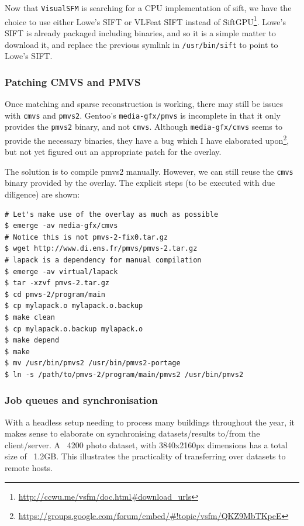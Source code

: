 \documentclass{article}
\begin{document}
Now that {\tt VisualSFM} is searching for a CPU implementation of sift, we have the choice to use either Lowe's SIFT or VLFeat SIFT instead of SiftGPU\footnote{\url{http://ccwu.me/vsfm/doc.html\#download\_urls}}. Lowe's SIFT is already packaged including binaries, and so it is a simple matter to download it, and replace the previous symlink in {\tt /usr/bin/sift} to point to Lowe's SIFT.

\subsubsection{Patching CMVS and PMVS}
Once matching and sparse reconstruction is working, there may still be issues with {\tt cmvs} and {\tt pmvs2}. Gentoo's {\tt media-gfx/pmvs} is incomplete in that it only provides the {\tt pmvs2} binary, and not {\tt cmvs}. Although {\tt media-gfx/cmvs} seems to provide the necessary binaries, they have a bug which I have elaborated upon\footnote{\url{https://groups.google.com/forum/embed/\#!topic/vsfm/QKZ9MbTKpeE}}, but not yet figured out an appropriate patch for the overlay.

The solution is to compile pmvs2 manually. However, we can still reuse the {\tt cmvs} binary provided by the overlay. The explicit steps (to be executed with due diligence) are shown:

\begin{lstlisting}
# Let's make use of the overlay as much as possible
$ emerge -av media-gfx/cmvs
# Notice this is not pmvs-2-fix0.tar.gz
$ wget http://www.di.ens.fr/pmvs/pmvs-2.tar.gz
# lapack is a dependency for manual compilation
$ emerge -av virtual/lapack
$ tar -xzvf pmvs-2.tar.gz
$ cd pmvs-2/program/main
$ cp mylapack.o mylapack.o.backup
$ make clean
$ cp mylapack.o.backup mylapack.o
$ make depend
$ make
$ mv /usr/bin/pmvs2 /usr/bin/pmvs2-portage
$ ln -s /path/to/pmvs-2/program/main/pmvs2 /usr/bin/pmvs2
\end{lstlisting}

\subsubsection{Job queues and synchronisation}

With a headless setup needing to process many buildings throughout the year, it makes sense to elaborate on synchronising datasets/results to/from the client/server. A ~4200 photo dataset, with 3840x2160px dimensions has a total size of ~1.2GB. This illustrates the practicality of transferring over datasets to remote hosts.
\end{document}
